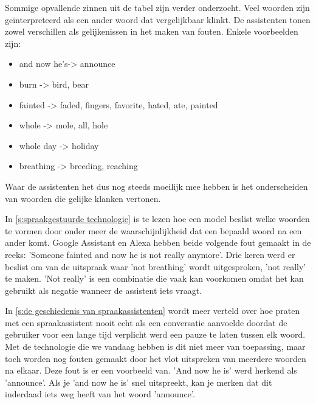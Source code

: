 Sommige opvallende zinnen uit de tabel zijn verder onderzocht. Veel woorden zijn geïnterpreteerd als een ander woord dat vergelijkbaar klinkt. De assistenten tonen zowel verschillen als gelijkenissen in het maken van fouten. Enkele voorbeelden zijn:
\begin{itemize}
    \item and now he's-> announce
    \item burn -> bird, bear
    \item fainted -> faded, fingers, favorite, hated, ate, painted
    \item whole -> mole, all, hole
    \item whole day -> holiday
    \item breathing -> breeding, reaching
\end{itemize}
Waar de assistenten het dus nog steeds moeilijk mee hebben is het onderscheiden van woorden die gelijke klanken vertonen.

In \ref{s:spraakgestuurde technologie} is te lezen hoe een model beslist welke woorden te vormen door onder meer de waarschijnlijkheid dat een bepaald woord na een ander komt. Google Assistant en Alexa hebben beide volgende fout gemaakt in de reeks: 'Someone fainted and now he is not really anymore'. Drie keren werd er beslist om van de uitspraak waar 'not breathing' wordt uitgesproken, 'not really' te maken. 'Not really' is een combinatie die vaak kan voorkomen omdat het kan gebruikt als negatie wanneer de assistent iets vraagt.

In \ref{s:de geschiedenis van spraakassistenten} wordt meer verteld over hoe praten met een spraakassistent nooit echt als een conversatie aanvoelde doordat de gebruiker voor een lange tijd verplicht werd een pauze te laten tussen elk woord. Met de technologie die we vandaag hebben is dit niet meer van toepassing, maar toch worden nog fouten gemaakt door het vlot uitspreken van meerdere woorden na elkaar. Deze fout is er een voorbeeld van. 'And now he is' werd herkend als 'announce'. Als je 'and now he is' snel uitspreekt, kan je merken dat dit inderdaad iets weg heeft van het woord 'announce'.